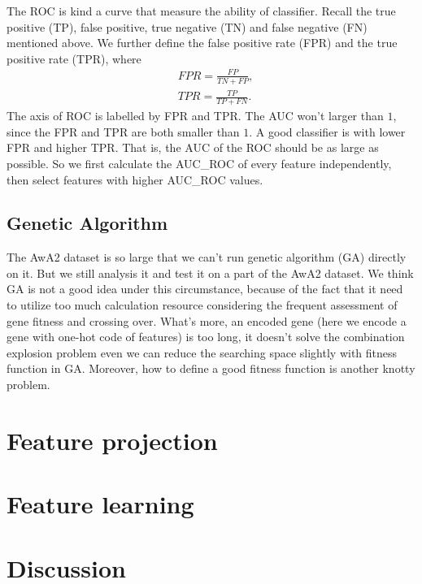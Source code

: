 \documentclass{article}
\begin{document}
The ROC is kind a curve that measure the ability of classifier. Recall the true positive (TP), false positive, true negative (TN) and false negative (FN) mentioned above. We further define the false positive rate (FPR) and the true positive rate (TPR), where
\begin{equation}
	\label{eq:roc}
	\begin{split}
		&FPR = \frac{FP}{TN+FP},\\
		&TPR = \frac{TP}{TP+FN}.
	\end{split}
\end{equation} 
The axis of ROC is labelled by FPR and TPR. The AUC won't larger than $1$, since the FPR and TPR are both smaller than $1$. A good classifier is with lower FPR and higher TPR. That is, the AUC of the ROC should be as large as possible. So we first calculate the AUC\_ROC of every feature independently, then select features with higher AUC\_ROC values. 

\subsection{Genetic Algorithm}
The AwA2 dataset is so large that we can't run genetic algorithm (GA) directly on it. But we still analysis it and test it on a part of the AwA2 dataset. We think GA is not a good idea under this circumstance, because of the fact that it need to utilize too much calculation resource considering the frequent assessment of gene fitness and crossing over. What's more, an encoded gene (here we encode a gene with one-hot code of features) is too long, it doesn't solve the combination explosion problem even we can reduce the searching space slightly with fitness function in GA. Moreover, how to define a good fitness function is another knotty problem.


\section{Feature projection}
\label{sec:projection}

\section{Feature learning}
\label{sec:learning}

\section{Discussion}
\label{sec:discussion}
\end{document}
